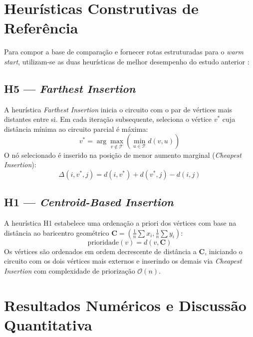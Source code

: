\documentclass[12pt, a4paper]{article}
\begin{document}
\section{Heurísticas Construtivas de Referência}

Para compor a base de comparação e fornecer rotas estruturadas para o \textit{warm start}, utilizam-se as duas heurísticas de melhor desempenho do estudo anterior \cite{bento2026}:

\subsection{H5 --- \textit{Farthest Insertion}}

A heurística \textit{Farthest Insertion} \cite{rosenkrantz1977} inicia o circuito com o par de vértices mais distantes entre si. Em cada iteração subsequente, seleciona o vértice $v^*$ cuja distância mínima ao circuito parcial é máxima:
\begin{equation}
    v^* = \arg\max_{v \notin \mathcal{T}} \left( \min_{u \in \mathcal{T}} d(v, u) \right)
\end{equation}
O nó selecionado é inserido na posição de menor aumento marginal (\textit{Cheapest Insertion}):
\begin{equation}
    \Delta(i, v^*, j) = d(i, v^*) + d(v^*, j) - d(i, j)
\end{equation}

\subsection{H1 --- \textit{Centroid-Based Insertion}}

A heurística H1 estabelece uma ordenação a priori dos vértices com base na distância ao baricentro geométrico $\mathbf{C} = \left(\frac{1}{n}\sum x_i, \frac{1}{n}\sum y_i\right)$:
\begin{equation}
    \mathrm{prioridade}(v) = d(v, \mathbf{C})
\end{equation}
Os vértices são ordenados em ordem decrescente de distância a $\mathbf{C}$, iniciando o circuito com os dois vértices mais externos e inserindo os demais via \textit{Cheapest Insertion} com complexidade de priorização $\mathcal{O}(n)$.

\section{Resultados Numéricos e Discussão Quantitativa}
\end{document}
